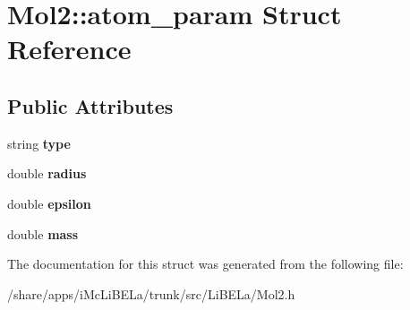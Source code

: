\hypertarget{structMol2_1_1atom__param}{
\section{Mol2::atom\_\-param Struct Reference}
\label{structMol2_1_1atom__param}
}
\subsection*{Public Attributes}
\begin{DoxyCompactItemize}
\item 
\hypertarget{structMol2_1_1atom__param_a3a318207d141dcf7ed9c83ae05462aca}{
string {\bfseries type}}
\label{structMol2_1_1atom__param_a3a318207d141dcf7ed9c83ae05462aca}

\item 
\hypertarget{structMol2_1_1atom__param_ad6cd0be63620d4c1ba46b91c2090bafb}{
double {\bfseries radius}}
\label{structMol2_1_1atom__param_ad6cd0be63620d4c1ba46b91c2090bafb}

\item 
\hypertarget{structMol2_1_1atom__param_adeba349f15a3f4adce4193cecea7a3bc}{
double {\bfseries epsilon}}
\label{structMol2_1_1atom__param_adeba349f15a3f4adce4193cecea7a3bc}

\item 
\hypertarget{structMol2_1_1atom__param_a27cc69f132677b4761be71d4f9fd0a17}{
double {\bfseries mass}}
\label{structMol2_1_1atom__param_a27cc69f132677b4761be71d4f9fd0a17}

\end{DoxyCompactItemize}


The documentation for this struct was generated from the following file:\begin{DoxyCompactItemize}
\item 
/share/apps/iMcLiBELa/trunk/src/LiBELa/Mol2.h\end{DoxyCompactItemize}
